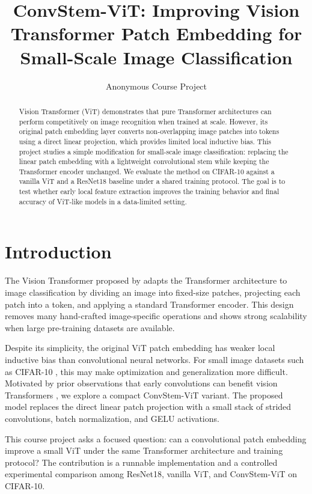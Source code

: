 \documentclass[letterpaper]{article}
\title{ConvStem-ViT: Improving Vision Transformer Patch Embedding for Small-Scale Image Classification}
\author{
    Anonymous Course Project
}
\begin{document}
\maketitle

\begin{abstract}
Vision Transformer (ViT) demonstrates that pure Transformer architectures can
perform competitively on image recognition when trained at scale. However, its
original patch embedding layer converts non-overlapping image patches into
tokens using a direct linear projection, which provides limited local inductive
bias. This project studies a simple modification for small-scale image
classification: replacing the linear patch embedding with a lightweight
convolutional stem while keeping the Transformer encoder unchanged. We evaluate
the method on CIFAR-10 against a vanilla ViT and a ResNet18 baseline under a
shared training protocol. The goal is to test whether early local feature
extraction improves the training behavior and final accuracy of ViT-like models
in a data-limited setting.
\end{abstract}

\section{Introduction}

The Vision Transformer proposed by \citet{dosovitskiy2021image} adapts the
Transformer architecture \citep{vaswani2017attention} to image classification by
dividing an image into fixed-size patches, projecting each patch into a token,
and applying a standard Transformer encoder. This design removes many
hand-crafted image-specific operations and shows strong scalability when large
pre-training datasets are available.

Despite its simplicity, the original ViT patch embedding has weaker local
inductive bias than convolutional neural networks. For small image datasets such
as CIFAR-10 \citep{krizhevsky2009learning}, this may make optimization and
generalization more difficult. Motivated by prior observations that early
convolutions can benefit vision Transformers \citep{xiao2021early}, we explore
a compact ConvStem-ViT variant. The proposed model replaces the direct linear
patch projection with a small stack of strided convolutions, batch
normalization, and GELU activations.

This course project asks a focused question: can a convolutional patch embedding
improve a small ViT under the same Transformer architecture and training
protocol? The contribution is a runnable implementation and a controlled
experimental comparison among ResNet18, vanilla ViT, and ConvStem-ViT on
CIFAR-10.
\end{document}
